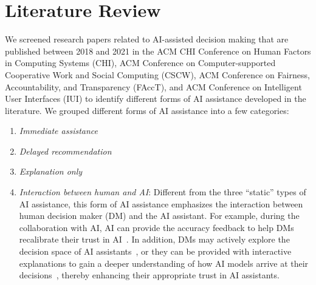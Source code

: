 \documentclass[letterpaper]{article} %
\begin{document}
\section{Literature Review}
We screened research papers related to AI-assisted decision making that are published between 2018 and 2021 in the ACM CHI Conference on Human Factors in Computing Systems (CHI), ACM Conference on Computer-supported Cooperative Work and
Social Computing (CSCW), ACM Conference on Fairness, Accountability, and Transparency (FAccT), and ACM Conference on Intelligent User Interfaces (IUI) to identify different forms of AI assistance developed in the literature. We grouped different forms of AI assistance into a few categories: 
\begin{enumerate}
    \item \emph{Immediate assistance}~\cite{Lai2018OnHP,Liu2021UnderstandingTE,Nourani2021AnchoringBA,Green2019ThePA,Tsai2021ExploringAP,Bansal2020DoesTW,Buccinca2021ToTO,Feng2018WhatCA,Guo2019VisualizingUA,Lee2020CoDesignAE,Lee2021AHC,Levy2021AssessingTI,Cheng2019ExplainingDA,Lai2020WhyI,PoursabziSangdeh2018ManipulatingAM,Chromik2021ITI,Jacobs2021DesigningAF,SmithRenner2020NoEW,Desmond2021IncreasingTS,Buccinca2020ProxyTA,Gajos2022DoPE,Gomez2020ViCEVC,Abdul2020COGAMMA,Brown2019TowardAA, Cai2019TheEO, Buccinca2020ProxyTA,Szymanski2021VisualTO,Green2019DisparateIA,DeArteaga2020ACF,Yang2020HowDV,Kunkel2019LetME,Das2020LeveragingRT,Yu2019DoIT,10.1145/3359284,Harrison2020AnES,Kocielnik2019WillYA} 

    \item \emph{Delayed recommendation}~\cite{Zhang2020EffectOC,Dodge2019ExplainingMA,Wang2021AreEH,Yin2019UnderstandingTE,Buccinca2021ToTO,Lu2021HumanRO,PoursabziSangdeh2018ManipulatingAM,10.1145/3359280,Park2019ASA}

    \item \emph{Explanation only}~\cite{Lai2018OnHP,Alqaraawi2020EvaluatingSM,Lucic2019WhyDM,Rader2018ExplanationsAM,Berkel2021EffectOI,Buccinca2020ProxyTA,Gajos2022DoPE,Anik2021DataCentricEE,Lucic2019WhyDM,Rader2018ExplanationsAM}

    \item \emph{Interaction between human and AI}: Different from the three ``static'' types of AI assistance, this form of AI assistance emphasizes the interaction between human decision maker (DM) and the AI assistant. For example, during the collaboration with AI, AI can provide the accuracy feedback to help DMs recalibrate their trust in AI~\cite{Bansal2020DoesTW,Yu2019DoIT}. In addition, DMs may actively explore the decision space of AI assistants~\cite{10.1145/3290605.3300234,10.1145/3411764.3445522}, or they can be provided with interactive explanations to gain a deeper understanding of how AI models arrive at their decisions~\cite{10.1145/3290605.3300234, Yang2020HowDV, SmithRenner2020NoEW,Liu2021UnderstandingTE,Cai2019HumanCenteredTF}, thereby enhancing their appropriate trust in AI assistants.

\end{enumerate}
\end{document}
